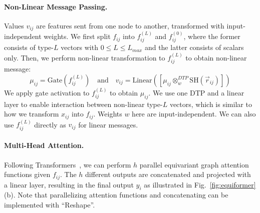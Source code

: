 \paragraph{Non-Linear Message Passing.}
Values $v_{ij}$ are features sent from one node to another, transformed with input-independent weights.
We first split $f_{ij}$ into $f_{ij}^{(L)}$ and $f_{ij}^{(0)}$, where the former consists of type-$L$ vectors with $0 \leq L \leq L_{max}$ and the latter consists of scalars only.
Then, we perform non-linear transformation to $f_{ij}^{(L)}$ to obtain non-linear message:
\begin{equation}
\mu_{ij} = \text{Gate}(f_{ij}^{(L)}) 
\quad\text{and}\quad
v_{ij} = \text{Linear}( [ \mu_{ij} \otimes_{w}^{DTP} \text{SH}(\vec{r}_{ij}) ] ) 
\end{equation}
We apply gate activation to $f_{ij}^{(L)}$ to obtain $\mu_{ij}$.
We use one DTP and a linear layer to enable interaction between non-linear type-$L$ vectors, which is similar to how we transform $x_{ij}$ into $f_{ij}$.
Weights $w$ here are input-independent.
We can also use $f_{ij}^{(L)}$ directly as $v_{ij}$ for linear messages.


\vspace{-2.25mm}
\paragraph{Multi-Head Attention.}
Following Transformers~\citep{transformer}, we can perform $h$ parallel equivariant graph attention functions given $f_{ij}$.
The $h$ different outputs are concatenated and projected with a linear layer, resulting in the final output $y_i$ as illustrated in Fig.~\ref{fig:equiformer}(b).
Note that parallelizing attention functions and concatenating can be implemented with ``Reshape''.